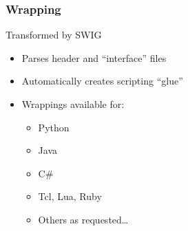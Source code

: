 \begin{frame}
\frametitle{Wrapping}
Transformed by SWIG
\begin{itemize}
\item Parses header and ``interface'' files
\item Automatically creates scripting ``glue''
\item Wrappings available for:
\begin{itemize}
  \item Python
  \item Java
  \item C\#
  \item Tcl, Lua, Ruby
  \item Others as requested\dots
\end{itemize}
\end{itemize}
\end{frame}





